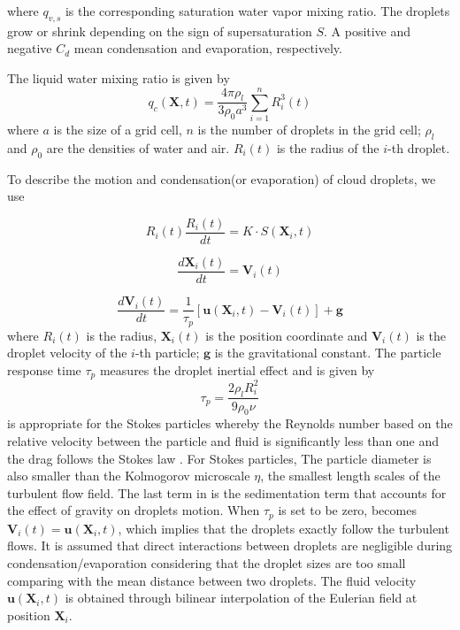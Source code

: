 where $q_{v,s}$ is the corresponding saturation water vapor mixing ratio. The droplets 
grow or shrink depending on the sign of supersaturation $S$. A positive and negative 
$C_d$ mean condensation and evaporation, respectively.

The liquid water mixing ratio is given by
\begin{equation}
q_{c}(\mathbf{X},t)=\frac{4\pi\rho_{l}}{3\rho_{0}a^{3}}\sum_{i=1}^{n}R_{i}^{3}(t)\label{eq:cloud_water}
\end{equation}
where $a$ is the size of a grid cell, $n$ is the number of droplets
in the grid cell; $\rho_{l}$ and $\rho_{0}$ are the densities of water 
and air. $R_{i}(t)$ is the radius of the $i$-th droplet.

To describe the motion and condensation(or evaporation) of cloud droplets, we use

\begin{equation}
R_i(t)\frac{R_i(t)}{dt}=K\cdot S(\mathbf{X}_i,t)\label{eq:Radius}
\end{equation}


\begin{equation}
\frac{d\mathbf{X}_i(t)}{dt}=\mathbf{V}_i(t)\label{eq:Coords}
\end{equation}


\begin{equation}
\frac{d\mathbf{V}_i(t)}{dt}=\frac{1}{\tau_{p}}[\mathbf{u}(\mathbf{X}_i,t)-\mathbf{V}_i(t)]+\mathbf{g}\label{eq:Velocity}
\end{equation}
where $R_i(t)$ is the radius, $\mathbf{X}_i(t)$ is the position
coordinate and $\mathbf{V}_i(t)$ is the droplet velocity of the $i$-th particle; $\mathbf{g}$ is the gravitational constant.
The particle response time $\tau_p$ measures the droplet inertial effect and is given by
\begin{equation}
\tau_{p}=\frac{2\rho_{l}R_i^{2}}{9\rho_{0}\nu}
\label{eq:response_time}
\end{equation}
 is appropriate for the Stokes particles whereby the Reynolds number 
based on the relative velocity between the particle and fluid is significantly less than one and the 
drag follows the Stokes law \cite{Eaton94}. For Stokes particles, The particle diameter is also smaller than the Kolmogorov microscale $\eta$, the smallest length scales of the turbulent flow field.
The last term in  is the sedimentation term that accounts for the effect of 
gravity on droplets motion. When $\tau_{p}$ is set to be zero,  becomes $\mathbf{V}_i(t)=\mathbf{u}(\mathbf{X}_i,t)$, 
which implies that the droplets exactly follow the turbulent flows. 
It is assumed that direct interactions between droplets are negligible during 
condensation/evaporation considering that the droplet sizes are too small comparing 
with the mean distance between two droplets. The fluid velocity $\mathbf{u}(\mathbf{X}_i, t)$ 
is obtained through bilinear interpolation of the Eulerian field at position $\mathbf{X}_i$.

